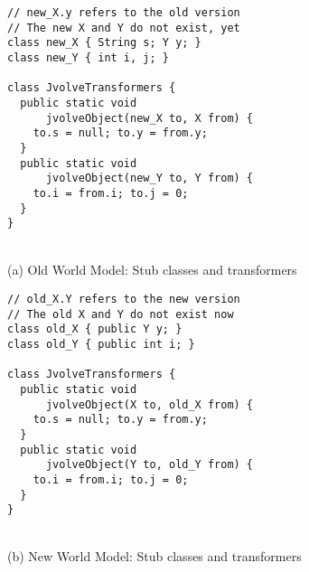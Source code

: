 \begin{figure}[p]
\BC
\begin{minipage}{0.62\textwidth}
\begin{lstlisting}[frame=single]
// new_X.y refers to the old version
// The new X and Y do not exist, yet
class new_X { String s; Y y; }
class new_Y { int i, j; }

class JvolveTransformers {
  public static void
      jvolveObject(new_X to, X from) {
    to.s = null; to.y = from.y;
  }
  public static void
      jvolveObject(new_Y to, Y from) {
    to.i = from.i; to.j = 0;
  }
}
\end{lstlisting}
\end{minipage} \\
(a) Old World Model: Stub classes and transformers \\[2ex]
\begin{minipage}{0.62\textwidth}
\begin{lstlisting}[frame=single]
// old_X.Y refers to the new version
// The old X and Y do not exist now
class old_X { public Y y; }
class old_Y { public int i; }

class JvolveTransformers {
  public static void
      jvolveObject(X to, old_X from) {
    to.s = null; to.y = from.y;
  }
  public static void
      jvolveObject(Y to, old_Y from) {
    to.i = from.i; to.j = 0;
  }
}
\end{lstlisting}
\end{minipage} \\
(b) New World Model: Stub classes and transformers \\[2ex]
\EC
\VspaceFixForHangcaption
\end{figure}
